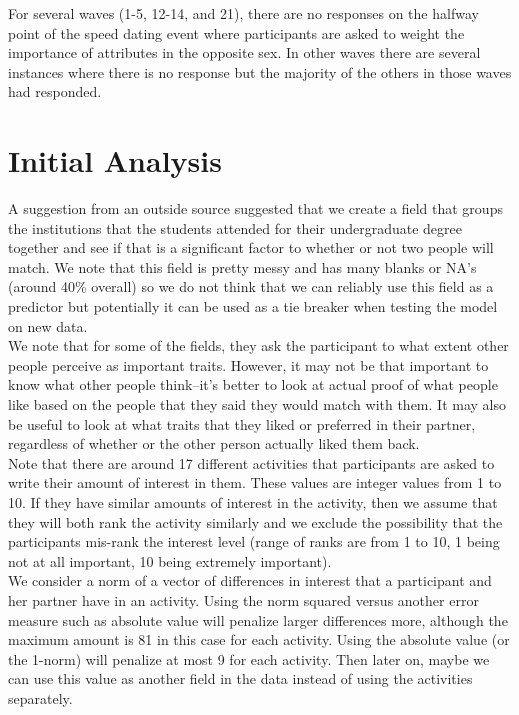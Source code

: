 \documentclass{article}
\begin{document}
For several waves (1-5, 12-14, and 21), there are no responses on the halfway point of the speed dating event where participants are asked to weight the importance of attributes in the opposite sex. In other waves there are several instances where there is no response but the majority of the others in those waves had responded.

\section{Initial Analysis}
A suggestion from an outside source suggested that we create a field that groups the institutions that the students attended for their undergraduate degree together and see if that is a significant factor to whether or not two people will match.  We note that this field is pretty messy and has many blanks or NA's (around 40\% overall) so we do not think that we can reliably use this field as a predictor but potentially it can be used as a tie breaker when testing the model on new data.\\

We note that for some of the fields, they ask the participant to what extent other people perceive as important traits. However, it may not be that important to know what other people think--it's better to look at actual proof of what people like based on the people that they said they would match with them.  It may also be useful to look at what traits that they liked or preferred in their partner, regardless of whether or the other person actually liked them back.\\

Note that there are around 17 different activities that participants are asked to 
write their amount of interest in them.  These values are integer values from 1 to 10.  If they have similar amounts of interest in the activity, then we assume that they will both rank the activity similarly and we exclude the possibility that the participants mis-rank the interest level (range of ranks are from 1 to 10, 1 being not at all important, 10 being extremely important).\\

We consider a norm of a vector of differences in interest that a participant and her partner have in an activity.  Using the norm squared versus another error measure such as absolute value will penalize larger differences more, although the maximum amount is 81 in this case for each activity. Using the absolute value (or the 1-norm) will penalize at most 9 for each activity. Then later on, maybe we can use this value as another field in the data instead of using the activities separately. \\
\end{document}
